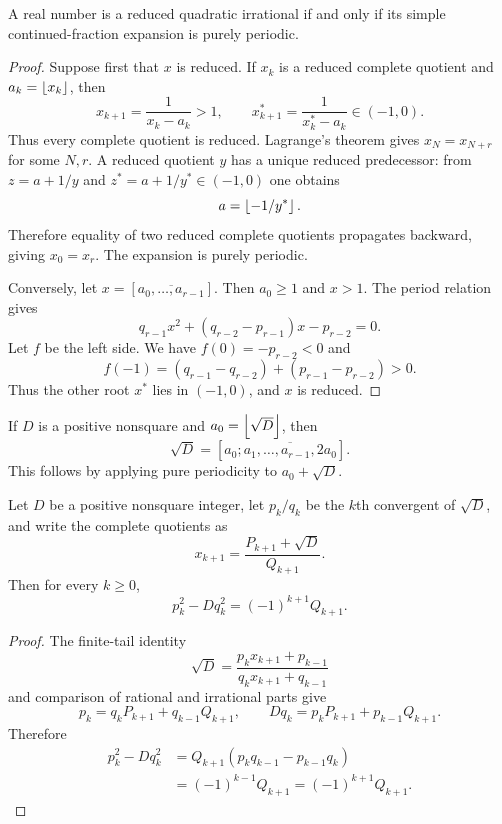 \begin{thm}
A real number is a reduced quadratic irrational if and only if its simple continued-fraction expansion is purely periodic.
\end{thm}
\begin{proof}
Suppose first that $x$ is reduced.  If $x_k$ is a reduced complete quotient and $a_k=\left\lfloor x_k \right\rfloor$, then
\[
 x_{k+1}=\frac1{x_k-a_k}>1,
 \qquad
 x_{k+1}^*=\frac1{x_k^*-a_k}\in(-1,0).
\]
Thus every complete quotient is reduced.  Lagrange's theorem gives $x_N=x_{N+r}$ for some $N,r$.  A reduced quotient $y$ has a unique reduced predecessor: from
$z=a+1/y$ and $z^*=a+1/y^*\in(-1,0)$ one obtains
\[
 a=\left\lfloor -1/y^* \right\rfloor.
\]
Therefore equality of two reduced complete quotients propagates backward, giving $x_0=x_r$.  The expansion is purely periodic.

Conversely, let
$x=[\overbar{a_0,\ldots,a_{r-1}}]$.  Then $a_0\ge1$ and $x>1$.  The period relation gives
\[
 q_{r-1}x^2+(q_{r-2}-p_{r-1})x-p_{r-2}=0.
\]
Let $f$ be the left side.  We have $f(0)=-p_{r-2}<0$ and
\[
 f(-1)=(q_{r-1}-q_{r-2})+(p_{r-1}-p_{r-2})>0.
\]
Thus the other root $x^*$ lies in $(-1,0)$, and $x$ is reduced.
\end{proof}

\begin{remark}
If $D$ is a positive nonsquare and $a_0=\left\lfloor \sqrt D \right\rfloor$, then
\[
 \sqrt D=[a_0;\overbar{a_1,\ldots,a_{r-1},2a_0}].
\]
This follows by applying pure periodicity to $a_0+\sqrt D$.
\end{remark}

\begin{thm}
Let $D$ be a positive nonsquare integer, let $p_k/q_k$ be the $k$th convergent of $\sqrt D$, and write the complete quotients as
\[
 x_{k+1}=\frac{P_{k+1}+\sqrt D}{Q_{k+1}}.
\]
Then for every $k\ge0$,
\[
 p_k^2-Dq_k^2=(-1)^{k+1}Q_{k+1}.
\]
\end{thm}
\begin{proof}
The finite-tail identity
\[
 \sqrt D=\frac{p_kx_{k+1}+p_{k-1}}{q_kx_{k+1}+q_{k-1}}
\]
and comparison of rational and irrational parts give
\[
 p_k=q_kP_{k+1}+q_{k-1}Q_{k+1},
 \qquad
 Dq_k=p_kP_{k+1}+p_{k-1}Q_{k+1}.
\]
Therefore
\begin{align*}
 p_k^2-Dq_k^2
 &=Q_{k+1}(p_kq_{k-1}-p_{k-1}q_k)\\
 &=(-1)^{k-1}Q_{k+1}=(-1)^{k+1}Q_{k+1}.
\end{align*}
\end{proof}
